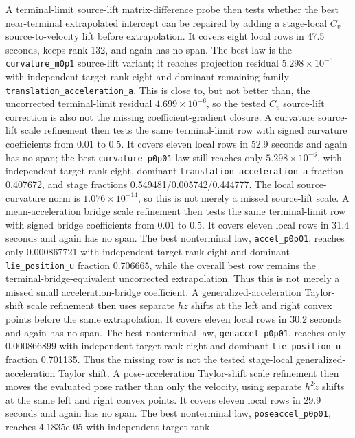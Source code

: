\documentclass[11pt]{article}
\begin{document}
A terminal-limit source-lift matrix-difference probe then tests whether the
best near-terminal extrapolated intercept can be repaired by adding a
stage-local $C_v$ source-to-velocity lift before extrapolation.  It covers
eight local rows in 47.5 seconds, keeps rank 132, and again has no span.  The
best law is the \texttt{curvature\_m0p1} source-lift variant; it reaches
projection residual $5.298\times10^{-6}$ with independent target rank eight
and dominant remaining family \nolinkurl{translation_acceleration_a}.
This is close to, but not better than, the uncorrected terminal-limit residual
$4.699\times10^{-6}$, so the tested $C_v$ source-lift correction is also not
the missing coefficient-gradient closure.
A curvature source-lift scale refinement then tests the same terminal-limit
row with signed curvature coefficients from $0.01$ to $0.5$.  It covers eleven
local rows in 52.9 seconds and again has no span; the best
\texttt{curvature\_p0p01} law still reaches only
$5.298\times10^{-6}$, with independent target rank eight, dominant
\nolinkurl{translation_acceleration_a} fraction 0.407672, and stage fractions
0.549481/0.005742/0.444777.  The local source-curvature norm is
$1.076\times10^{-14}$, so this is not merely a missed source-lift scale.
A mean-acceleration bridge scale refinement then tests the same terminal-limit
row with signed bridge coefficients from $0.01$ to $0.5$.  It covers eleven
local rows in 31.4 seconds and again has no span.  The best nonterminal law,
\texttt{accel\_p0p01}, reaches only 0.000867721 with independent target rank
eight and dominant \nolinkurl{lie_position_u} fraction 0.706665, while the
overall best row remains the terminal-bridge-equivalent uncorrected
extrapolation.  Thus this is not merely a missed small acceleration-bridge
coefficient.
A generalized-acceleration Taylor-shift scale refinement then uses separate
$h\dot z$ shifts at the left and right convex points before the same
extrapolation.  It covers eleven local rows in 30.2 seconds and again has no
span.  The best nonterminal law, \texttt{genaccel\_p0p01}, reaches only
0.000866899 with independent target rank eight and dominant
\nolinkurl{lie_position_u} fraction 0.701135.  Thus the missing row is not the
tested stage-local generalized-acceleration Taylor shift.
A pose-acceleration Taylor-shift scale refinement then moves the evaluated
pose rather than only the velocity, using separate $h^2\dot z$ shifts at the
same left and right convex points.  It covers eleven local rows in 29.9
seconds and again has no span.  The best nonterminal law,
\texttt{poseaccel\_p0p01}, reaches 4.1835e-05 with independent target rank
\end{document}
